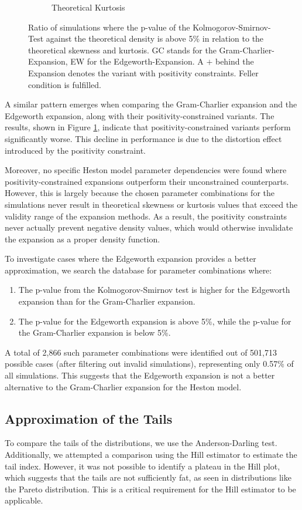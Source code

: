 \begin{figure}
\begin{subfigure}[b]{0.49\textwidth}
        \caption{Theoretical Kurtosis}
    \end{subfigure}
    \caption{Ratio of simulations where the p-value of the Kolmogorov-Smirnov-Test against the theoretical density is above 5\% in relation to the theoretical skewness and kurtosis. GC stands for the Gram-Charlier-Expansion, EW for the Edgeworth-Expansion. A $+$ behind the Expansion denotes the variant with positivity constraints. Feller condition is fulfilled.}
    \label{fig:gc_vs_ew_theoretical_skewness_kurtosis}
\end{figure}

A similar pattern emerges when comparing the Gram-Charlier expansion and the Edgeworth expansion, along with their positivity-constrained variants. The results, shown in Figure \ref{fig:gc_vs_ew_theoretical_skewness_kurtosis}, indicate that positivity-constrained variants perform significantly worse. This decline in performance is due to the distortion effect introduced by the positivity constraint.

Moreover, no specific Heston model parameter dependencies were found where posi\-tivity-constrained expansions outperform their unconstrained counterparts. However, this is largely because the chosen parameter combinations for the simulations never result in theoretical skewness or kurtosis values that exceed the validity range of the expansion methods. As a result, the positivity constraints never actually prevent negative density values, which would otherwise invalidate the expansion as a proper density function.

To investigate cases where the Edgeworth expansion provides a better approximation, we search the database for parameter combinations where:
\begin{enumerate}
    \item The p-value from the Kolmogorov-Smirnov test is higher for the Edgeworth expansion than for the Gram-Charlier expansion.
    \item The p-value for the Edgeworth expansion is above 5\%, while the p-value for the Gram-Charlier expansion is below 5\%.
\end{enumerate}
A total of 2,866 such parameter combinations were identified out of 501,713 possible cases (after filtering out invalid simulations), representing only 0.57\% of all simulations. This suggests that the Edgeworth expansion is not a better alternative to the Gram-Charlier expansion for the Heston model.

\subsection{Approximation of the Tails}
To compare the tails of the distributions, we use the Anderson-Darling test. Additionally, we attempted a comparison using the Hill estimator to estimate the tail index. However, it was not possible to identify a plateau in the Hill plot, which suggests that the tails are not sufficiently fat, as seen in distributions like the Pareto distribution. This is a critical requirement for the Hill estimator to be applicable.

